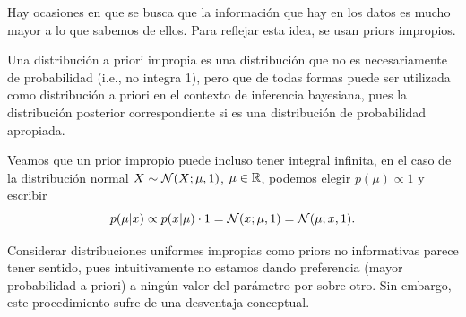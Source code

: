 Hay ocasiones en que se busca que la información que hay en los datos es mucho mayor a lo que sabemos de ellos. Para reflejar esta idea, se usan priors impropios.

\begin{definition} Una distribución a priori impropia es una distribución que no es necesariamente de probabilidad (i.e., no integra 1), pero que de todas formas puede ser utilizada como distribución a priori en el contexto de inferencia bayesiana, pues la distribución posterior correspondiente si es una distribución de probabilidad apropiada. 
\end{definition}

\begin{remark} Veamos que un prior impropio puede incluso tener integral infinita, en el caso de la distribución normal $X\sim{\mathcal N}(X;\mu,1)$,  $\mu\in{\mathbb R}$, podemos elegir $p(\mu)\propto1$ y escribir 
\begin{equation}
	p(\mu|x)\propto p(x|\mu)\cdot 1 = {\mathcal N}(x;\mu,1) = {\mathcal N}(\mu;x,1). 
\end{equation}
	
\end{remark}

Considerar distribuciones uniformes impropias como priors no informativas parece tener sentido, pues intuitivamente no estamos dando preferencia (mayor probabilidad a priori) a ningún valor del parámetro por sobre otro. Sin embargo, este procedimiento sufre de una desventaja conceptual.

